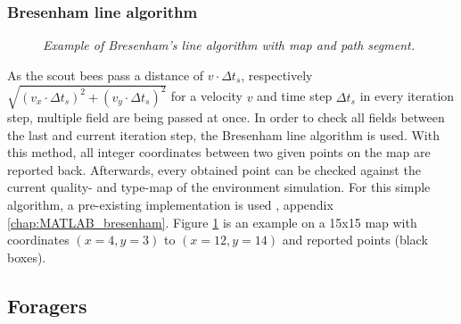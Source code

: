 	\subsubsection{Bresenham line algorithm}
		\begin{figure}
			\centering
			\caption{\textit{Example of Bresenham's line algorithm with map and path segment.}}
			\label{fig:bresenham}
		\end{figure}
		As the scout bees pass a distance of $v \cdot \Delta t_s$, respectively $\sqrt{(v_x \cdot \Delta t_s)^2 + (v_y \cdot \Delta t_s)^2}$ for a velocity $v$ and time step $\Delta t_s$ in every iteration step, multiple field are being passed at once. In order to check all fields between the last and current iteration step, the Bresenham line algorithm is used. With this method, all integer coordinates between two given points on the map are reported back. Afterwards, every obtained point can be checked against the current quality- and type-map of the environment simulation.
		For this simple algorithm, a pre-existing implementation is used \cite{MVTB}, appendix \ref{chap:MATLAB_bresenham}. Figure \ref{fig:bresenham} is an example on a 15x15 map with coordinates $(x = 4, y = 3)$ to $(x = 12, y = 14)$ and reported points (black boxes).
\subsection{Foragers}
